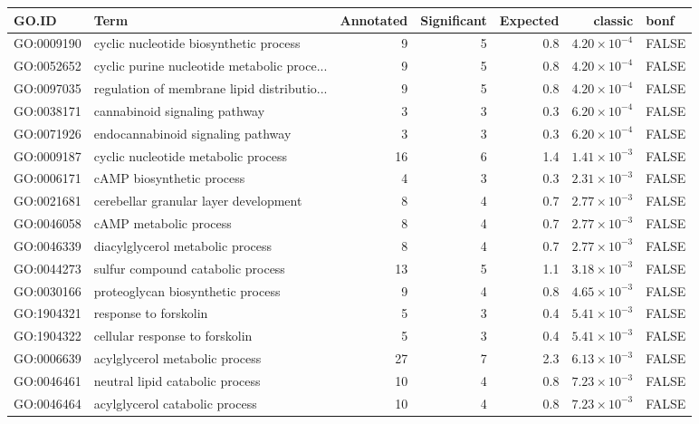 \begin{table}[ht]
\centering
\begin{tabular}{llrrrrl}
  \hline
GO.ID & Term & Annotated & Significant & Expected & classic & bonf \\ 
  \hline
GO:0009190 & cyclic nucleotide biosynthetic process & 9 & 5 & 0.8 & $4.20 \times 10^{-4}$ & FALSE \\ 
  GO:0052652 & cyclic purine nucleotide metabolic proce... & 9 & 5 & 0.8 & $4.20 \times 10^{-4}$ & FALSE \\ 
  GO:0097035 & regulation of membrane lipid distributio... & 9 & 5 & 0.8 & $4.20 \times 10^{-4}$ & FALSE \\ 
  GO:0038171 & cannabinoid signaling pathway & 3 & 3 & 0.3 & $6.20 \times 10^{-4}$ & FALSE \\ 
  GO:0071926 & endocannabinoid signaling pathway & 3 & 3 & 0.3 & $6.20 \times 10^{-4}$ & FALSE \\ 
  GO:0009187 & cyclic nucleotide metabolic process & 16 & 6 & 1.4 & $1.41 \times 10^{-3}$ & FALSE \\ 
  GO:0006171 & cAMP biosynthetic process & 4 & 3 & 0.3 & $2.31 \times 10^{-3}$ & FALSE \\ 
  GO:0021681 & cerebellar granular layer development & 8 & 4 & 0.7 & $2.77 \times 10^{-3}$ & FALSE \\ 
  GO:0046058 & cAMP metabolic process & 8 & 4 & 0.7 & $2.77 \times 10^{-3}$ & FALSE \\ 
  GO:0046339 & diacylglycerol metabolic process & 8 & 4 & 0.7 & $2.77 \times 10^{-3}$ & FALSE \\ 
  GO:0044273 & sulfur compound catabolic process & 13 & 5 & 1.1 & $3.18 \times 10^{-3}$ & FALSE \\ 
  GO:0030166 & proteoglycan biosynthetic process & 9 & 4 & 0.8 & $4.65 \times 10^{-3}$ & FALSE \\ 
  GO:1904321 & response to forskolin & 5 & 3 & 0.4 & $5.41 \times 10^{-3}$ & FALSE \\ 
  GO:1904322 & cellular response to forskolin & 5 & 3 & 0.4 & $5.41 \times 10^{-3}$ & FALSE \\ 
  GO:0006639 & acylglycerol metabolic process & 27 & 7 & 2.3 & $6.13 \times 10^{-3}$ & FALSE \\ 
  GO:0046461 & neutral lipid catabolic process & 10 & 4 & 0.8 & $7.23 \times 10^{-3}$ & FALSE \\ 
  GO:0046464 & acylglycerol catabolic process & 10 & 4 & 0.8 & $7.23 \times 10^{-3}$ & FALSE \\ 

\end{tabular}
\end{table}
